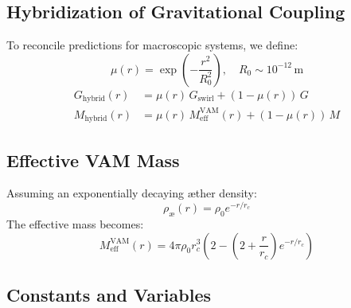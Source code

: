 \documentclass[12pt]{article}
\begin{document}
\subsection{Hybridization of Gravitational Coupling}

To reconcile predictions for macroscopic systems, we define:
\[
    \mu(r) = \exp\left(-\frac{r^2}{R_0^2}\right), \quad R_0 \sim 10^{-12} \, \mathrm{m}
\]
\begin{align*}
    G_{\text{hybrid}}(r) &= \mu(r) \, G_{\text{swirl}} + (1 - \mu(r)) \, G \\
    M_{\text{hybrid}}(r) &= \mu(r) \, M_{\text{eff}}^\text{VAM}(r) + (1 - \mu(r)) \, M
\end{align*}

\subsection{Effective VAM Mass}
Assuming an exponentially decaying æther density:
\[
\rho_\text{\ae}(r) = \rho_0 e^{-r / r_c}
\]
The effective mass becomes:
\[
M_\text{eff}^\text{VAM}(r) = 4\pi \rho_0 r_c^3 \left(2 - \left(2 + \frac{r}{r_c} \right) e^{-r/r_c} \right)
\]

\subsection{Constants and Variables}
\end{document}
